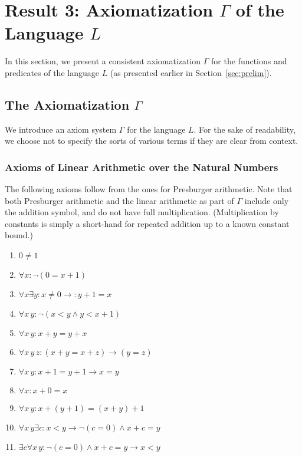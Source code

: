\section{Result 3: Axiomatization $\Gamma$ of the Language $L$}
\label{sec:soundness}

In this section, we present a consistent
axiomatization $\Gamma$ for the functions and predicates of the
language $L$ (as presented earlier in Section~\ref{sec:prelim}).

\subsection{The Axiomatization $\Gamma$}
\label{sec:axioms}

We introduce an axiom system $\Gamma$ for the language $L$.
For the sake of readability, we choose not to specify the
sorts of various terms if they are clear from context.

\subsubsection{Axioms of Linear Arithmetic over the Natural Numbers}

The following axioms follow from the ones for Presburger
arithmetic. Note that both Presburger arithmetic and the linear
arithmetic as part of $\Gamma$ include only the addition symbol, and
do not have full multiplication. (Multiplication by constants is
simply a short-hand for repeated addition up to a known constant
bound.)

\begin{enumerate}

\item $0 \neq 1$
  
\item $\forall x : \lnot (0 = x + 1)$

\item $\forall x \exists y : x \ne 0 \to : y + 1 = x$ 

\item $\forall x \, y : \lnot (x < y \land y < x + 1)$ 

\item $\forall x\, y : x + y = y + x$ 

\item $\forall x\, y\, z : (x + y = x + z) \to (y = z)$ 

\item $\forall x\, y : x + 1 = y + 1 \to x = y$

\item $\forall x : x + 0 = x$

\item $\forall x\, y : x + (y + 1) = (x + y) + 1$



\item $\forall x\, y \exists c : x < y \to \lnot (c = 0) \land x + c = y$

\item $\exists c \forall x \, y: \lnot (c = 0) \land x + c = y \to x < y $

\end{enumerate}

